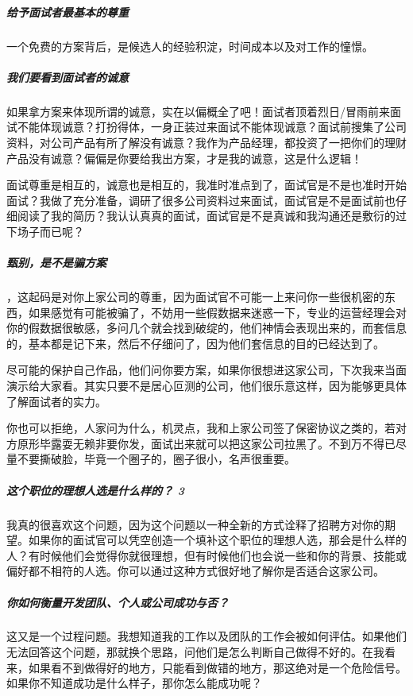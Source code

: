 \documentclass[letterpaper,11pt,english]{sphinxmanual}
\begin{document}
\subparagraph{给予面试者最基本的尊重}
\label{\detokenize{chapter_interview/interviewer:id7}}
一个免费的方案背后，是候选人的经验积淀，时间成本以及对工作的憧憬。


\subparagraph{我们要看到面试者的诚意}
\label{\detokenize{chapter_interview/interviewer:id8}}
如果拿方案来体现所谓的诚意，实在以偏概全了吧！面试者顶着烈日/冒雨前来面试不能体现诚意？打扮得体，一身正装过来面试不能体现诚意？面试前搜集了公司资料，对公司产品有所了解没有诚意？我作为产品经理，都投资了一把你们的理财产品没有诚意？偏偏是你要给我出方案，才是我的诚意，这是什么逻辑！

面试尊重是相互的，诚意也是相互的，我准时准点到了，面试官是不是也准时开始面试？我做了充分准备，调研了很多公司资料过来面试，面试官是不是面试前也仔细阅读了我的简历？我认认真真的面试，面试官是不是真诚和我沟通还是敷衍的过下场子而已呢？


\subparagraph{甄别，是不是骗方案}
\label{\detokenize{chapter_interview/interviewer:id9}}
，这起码是对你上家公司的尊重，因为面试官不可能一上来问你一些很机密的东西，如果感觉有可能被骗了，不妨用一些假数据来迷惑一下，专业的运营经理会对你的假数据很敏感，多问几个就会找到破绽的，他们神情会表现出来的，而套信息的，基本都是记下来，然后不仔细问了，因为他们套信息的目的已经达到了。

尽可能的保护自己作品，他们问你要方案，如果你很想进这家公司，下次我来当面演示给大家看。其实只要不是居心叵测的公司，他们很乐意这样，因为能够更具体了解面试者的实力。

你也可以拒绝，人家问为什么，机灵点，我和上家公司签了保密协议之类的，若对方原形毕露耍无赖非要你发，面试出来就可以把这家公司拉黑了。不到万不得已尽量不要撕破脸，毕竟一个圈子的，圈子很小，名声很重要。


\subparagraph{这个职位的理想人选是什么样的？ 3\sphinxfootnotemark[287]}
\label{\detokenize{chapter_interview/interviewer:id10}}%
\begin{footnotetext}[287]\sphinxAtStartFootnote
{}
%
\end{footnotetext}\ignorespaces 
我真的很喜欢这个问题，因为这个问题以一种全新的方式诠释了招聘方对你的期望。如果你的面试官可以凭空创造一个填补这个职位的理想人选，那会是什么样的人？有时候他们会觉得你就很理想，但有时候他们也会说一些和你的背景、技能或偏好都不相符的人选。你可以通过这种方式很好地了解你是否适合这家公司。


\subparagraph{你如何衡量开发团队、个人或公司成功与否？}
\label{\detokenize{chapter_interview/interviewer:id11}}
这又是一个过程问题。我想知道我的工作以及团队的工作会被如何评估。如果他们无法回答这个问题，那就换个思路，问他们是怎么判断自己做得不好的。在我看来，如果看不到做得好的地方，只能看到做错的地方，那这绝对是一个危险信号。如果你不知道成功是什么样子，那你怎么能成功呢？
\end{document}
